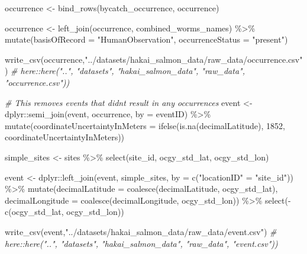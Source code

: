 \documentclass[
]{book}
\newenvironment{Shaded}{\begin{snugshade}}{\end{snugshade}}
\newcommand{\AttributeTok}[1]{\textcolor[rgb]{0.77,0.63,0.00}{#1}}
\newcommand{\CommentTok}[1]{\textcolor[rgb]{0.56,0.35,0.01}{\textit{#1}}}
\newcommand{\DecValTok}[1]{\textcolor[rgb]{0.00,0.00,0.81}{#1}}
\newcommand{\FunctionTok}[1]{\textcolor[rgb]{0.00,0.00,0.00}{#1}}
\newcommand{\NormalTok}[1]{#1}
\newcommand{\OtherTok}[1]{\textcolor[rgb]{0.56,0.35,0.01}{#1}}
\newcommand{\SpecialCharTok}[1]{\textcolor[rgb]{0.00,0.00,0.00}{#1}}
\newcommand{\StringTok}[1]{\textcolor[rgb]{0.31,0.60,0.02}{#1}}
\begin{document}
\begin{Shaded}
\begin{Highlighting}[]
\NormalTok{occurrence }\OtherTok{\textless{}{-}} \FunctionTok{bind\_rows}\NormalTok{(bycatch\_occurrence, occurrence)}

\NormalTok{occurrence }\OtherTok{\textless{}{-}} \FunctionTok{left\_join}\NormalTok{(occurrence, combined\_worms\_names) }\SpecialCharTok{\%\textgreater{}\%} 
    \FunctionTok{mutate}\NormalTok{(}\AttributeTok{basisOfRecord =} \StringTok{"HumanObservation"}\NormalTok{,}
        \AttributeTok{occurrenceStatus =} \StringTok{"present"}\NormalTok{)}

\FunctionTok{write\_csv}\NormalTok{(occurrence,}\StringTok{"../datasets/hakai\_salmon\_data/raw\_data/occurrence.csv"}\NormalTok{) }\CommentTok{\# here::here("..", "datasets", "hakai\_salmon\_data", "raw\_data",   "occurrence.csv"))}

\CommentTok{\# This removes events that didn\textquotesingle{}t result in any occurrences}
\NormalTok{event }\OtherTok{\textless{}{-}}\NormalTok{ dplyr}\SpecialCharTok{::}\FunctionTok{semi\_join}\NormalTok{(event, occurrence, }\AttributeTok{by =} \StringTok{\textquotesingle{}eventID\textquotesingle{}}\NormalTok{) }\SpecialCharTok{\%\textgreater{}\%} 
  \FunctionTok{mutate}\NormalTok{(}\AttributeTok{coordinateUncertaintyInMeters =} \FunctionTok{ifelse}\NormalTok{(}\FunctionTok{is.na}\NormalTok{(decimalLatitude), }\DecValTok{1852}\NormalTok{, coordinateUncertaintyInMeters))}

\NormalTok{simple\_sites }\OtherTok{\textless{}{-}}\NormalTok{ sites }\SpecialCharTok{\%\textgreater{}\%} 
  \FunctionTok{select}\NormalTok{(site\_id, ocgy\_std\_lat, ocgy\_std\_lon)}

\NormalTok{event }\OtherTok{\textless{}{-}}\NormalTok{ dplyr}\SpecialCharTok{::}\FunctionTok{left\_join}\NormalTok{(event, simple\_sites, }\AttributeTok{by =} \FunctionTok{c}\NormalTok{(}\StringTok{"locationID"} \OtherTok{=} \StringTok{"site\_id"}\NormalTok{)) }\SpecialCharTok{\%\textgreater{}\%} 
  \FunctionTok{mutate}\NormalTok{(}\AttributeTok{decimalLatitude =} \FunctionTok{coalesce}\NormalTok{(decimalLatitude, ocgy\_std\_lat),}
         \AttributeTok{decimalLongitude =} \FunctionTok{coalesce}\NormalTok{(decimalLongitude, ocgy\_std\_lon)) }\SpecialCharTok{\%\textgreater{}\%} 
  \FunctionTok{select}\NormalTok{(}\SpecialCharTok{{-}}\FunctionTok{c}\NormalTok{(ocgy\_std\_lat, ocgy\_std\_lon))}

\FunctionTok{write\_csv}\NormalTok{(event,}\StringTok{"../datasets/hakai\_salmon\_data/raw\_data/event.csv"}\NormalTok{) }\CommentTok{\# here::here("..", "datasets", "hakai\_salmon\_data", "raw\_data",   "event.csv"))}
\end{Highlighting}
\end{Shaded}
\end{document}
